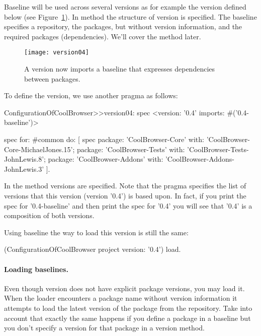 \documentclass[a4paper,10pt,twoside]{book}
\begin{document}
Baseline  will be used across several versions as for example the version  defined below (see Figure~\ref{fig:version04}). In method  the structure of version  is specified. The baseline specifies a repository, the packages, but without version information, and the required packages (dependencies). We'll cover the  method  later.

\begin{figure}
\begin{center}
\texttt{[image: version04]}
\caption{A version now imports a baseline that expresses dependencies between packages.\label{fig:version04}}
\end{center}
\end{figure} 

To define the version, we use another pragma  as follows:

\begin{code}{}
ConfigurationOfCoolBrowser>>version04: spec 
       <version: '0.4' imports: #('0.4-baseline')>
       
       spec for: #common do: [
              spec 
                     package: 'CoolBrowser-Core' with: 'CoolBrowser-Core-MichaelJones.15';
                     package: 'CoolBrowser-Tests' with: 'CoolBrowser-Tests-JohnLewis.8';
                     package: 'CoolBrowser-Addons' with: 'CoolBrowser-Addons-JohnLewis.3' ].
\end{code}


In the method  versions are specified. Note that the pragma  specifies the list of versions that this version (version '0.4') is based upon. In fact, if you print the spec for '0.4-baseline' and then print the spec for '0.4' you will see that '0.4' is a composition of both versions.

Using baseline the way to load this version is still the same:
\begin{code}{}
(ConfigurationOfCoolBrowser project version: '0.4') load.
\end{code}


\paragraph{Loading baselines.}
Even though version  does not have explicit package versions, you may load it. When the loader encounters a package name without version information it attempts to load the latest version of the package from the repository. Take into account that exactly the same happens if you define a package in a baseline but you don't specify a version for that package in a version method. 
 
\end{document}
